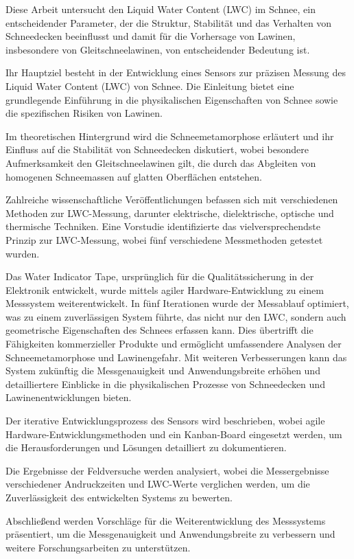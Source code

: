 Diese Arbeit untersucht den Liquid Water Content (LWC) im Schnee, ein entscheidender Parameter, der die Struktur, Stabilität und das Verhalten von Schneedecken beeinflusst und damit für die Vorhersage von Lawinen, insbesondere von Gleitschneelawinen, von entscheidender Bedeutung ist.

Ihr Hauptziel besteht in der Entwicklung eines Sensors zur präzisen Messung des Liquid Water Content (LWC) von Schnee. Die Einleitung bietet eine grundlegende Einführung in die physikalischen Eigenschaften von Schnee sowie die spezifischen Risiken von Lawinen.

Im theoretischen Hintergrund wird die Schneemetamorphose erläutert und ihr Einfluss auf die Stabilität von Schneedecken diskutiert, wobei besondere Aufmerksamkeit den Gleitschneelawinen gilt, die durch das Abgleiten von homogenen Schneemassen auf glatten Oberflächen entstehen.

Zahlreiche wissenschaftliche Veröffentlichungen befassen sich mit verschiedenen Methoden zur LWC-Messung, darunter elektrische, dielektrische, optische und thermische Techniken. Eine Vorstudie identifizierte das vielversprechendste Prinzip zur LWC-Messung, wobei fünf verschiedene Messmethoden getestet wurden.

Das Water Indicator Tape, ursprünglich für die Qualitätssicherung in der Elektronik entwickelt, wurde mittels agiler Hardware-Entwicklung zu einem Messsystem weiterentwickelt. In fünf Iterationen wurde der Messablauf optimiert, was zu einem zuverlässigen System führte, das nicht nur den LWC, sondern auch geometrische Eigenschaften des Schnees erfassen kann. Dies übertrifft die Fähigkeiten kommerzieller Produkte und ermöglicht umfassendere Analysen der Schneemetamorphose und Lawinengefahr. Mit weiteren Verbesserungen kann das System zukünftig die Messgenauigkeit und Anwendungsbreite erhöhen und detailliertere Einblicke in die physikalischen Prozesse von Schneedecken und Lawinenentwicklungen bieten.

Der iterative Entwicklungsprozess des Sensors wird beschrieben, wobei agile Hardware-Entwicklungsmethoden und ein Kanban-Board eingesetzt werden, um die Herausforderungen und Lösungen detailliert zu dokumentieren.

Die Ergebnisse der Feldversuche werden analysiert, wobei die Messergebnisse verschiedener Andruckzeiten und LWC-Werte verglichen werden, um die Zuverlässigkeit des entwickelten Systems zu bewerten.

Abschließend werden Vorschläge für die Weiterentwicklung des Messsystems präsentiert, um die Messgenauigkeit und Anwendungsbreite zu verbessern und weitere Forschungsarbeiten zu unterstützen.
